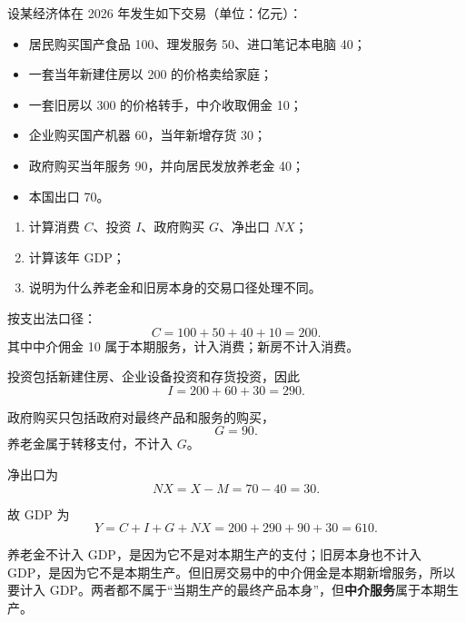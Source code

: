 \begin{question}
设某经济体在 2026 年发生如下交易（单位：亿元）：

\begin{itemize}[leftmargin=2em,itemsep=0.2em,topsep=0.2em]
  \item 居民购买国产食品 100、理发服务 50、进口笔记本电脑 40；
  \item 一套当年新建住房以 200 的价格卖给家庭；
  \item 一套旧房以 300 的价格转手，中介收取佣金 10；
  \item 企业购买国产机器 60，当年新增存货 30；
  \item 政府购买当年服务 90，并向居民发放养老金 40；
  \item 本国出口 70。
\end{itemize}

\begin{enumerate}[label=(\arabic*),leftmargin=2.5em]
  \item 计算消费 $C$、投资 $I$、政府购买 $G$、净出口 $NX$；
  \item 计算该年 GDP；
  \item 说明为什么养老金和旧房本身的交易口径处理不同。
\end{enumerate}

\begin{solution}
按支出法口径：
\[
C=100+50+40+10=200.
\]
其中中介佣金 10 属于本期服务，计入消费；新房不计入消费。

投资包括新建住房、企业设备投资和存货投资，因此
\[
I=200+60+30=290.
\]

政府购买只包括政府对最终产品和服务的购买，
\[
G=90.
\]
养老金属于转移支付，不计入 $G$。

净出口为
\[
NX=X-M=70-40=30.
\]

故 GDP 为
\[
Y=C+I+G+NX=200+290+90+30=610.
\]

养老金不计入 GDP，是因为它不是对本期生产的支付；旧房本身也不计入 GDP，是因为它不是本期生产。但旧房交易中的中介佣金是本期新增服务，所以要计入 GDP。两者都不属于“当期生产的最终产品本身”，但\textbf{中介服务}属于本期生产。
\end{solution}
\end{question}

